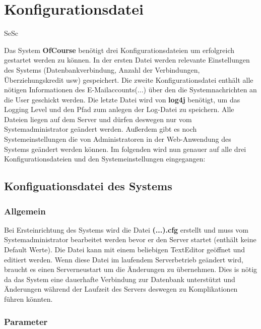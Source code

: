 \chapter{Konfigurationsdatei}
\begin{tiny}
	SeSc
\end{tiny}

Das System \textbf{OfCourse} benötigt drei Konfigurationsdateien um erfolgreich gestartet werden zu können. In der ersten Datei werden relevante Einstellungen des Systems (Datenbankverbindung, Anzahl der Verbindungen, Überziehungskredit usw) gespeichert. Die zweite Konfigurationsdatei enthält alle nötigen Informationen des E-Mailaccounts(...) über den die Systemnachrichten an die User geschickt werden. Die letzte Datei wird von \textbf{log4j} benötigt, um das Logging Level und den Pfad zum anlegen der Log-Datei zu speichern. Alle Dateien liegen auf dem Server und dürfen deswegen nur vom Systemadministrator geändert werden. Außerdem gibt es noch Systemeinstellungen die von Administratoren in der Web-Anwendung des Systems geändert werden können.  Im folgenden wird nun genauer auf alle drei Konfigurationsdateien und den Systemeinstellungen eingegangen:

\section{Konfiguationsdatei des Systems}
\subsection{Allgemein}

Bei Ersteinrichtung des Systems wird die Datei \textbf{(...).cfg} erstellt und muss vom Systemadministrator bearbeitet werden bevor er den Server startet (enthält keine Default Werte). Die Datei kann mit einem beliebigen TextEditor geöffnet und editiert werden. Wenn diese Datei im laufendem Serverbetrieb geändert wird, braucht es einen Serverneustart um die Änderungen zu übernehmen. Dies is nötig da das System eine dauerhafte Verbindung zur Datenbank unterstützt und Änderungen während der Laufzeit des Servers deswegen zu Komplikationen führen könnten.


\subsection{Parameter}

